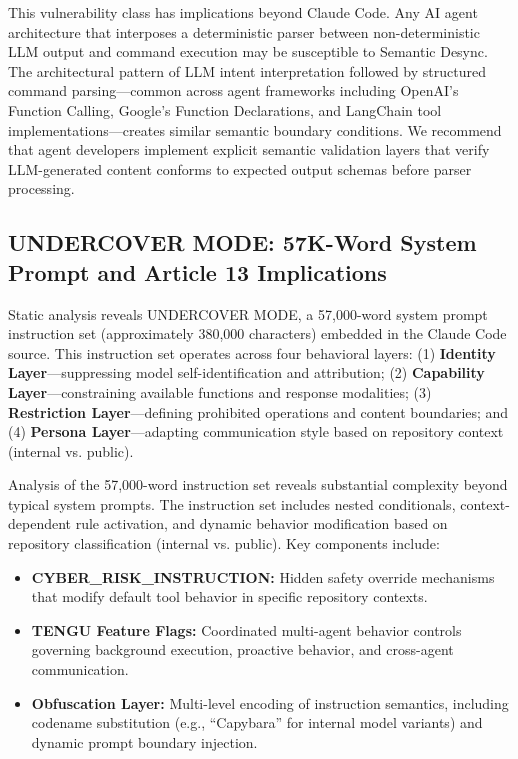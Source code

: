 \documentclass[10pt,conference]{IEEEtran}
\begin{document}
This vulnerability class has implications beyond Claude Code. Any AI agent architecture that interposes a deterministic parser between non-deterministic LLM output and command execution may be susceptible to Semantic Desync. The architectural pattern of LLM intent interpretation followed by structured command parsing---common across agent frameworks including OpenAI's Function Calling, Google's Function Declarations, and LangChain tool implementations---creates similar semantic boundary conditions. We recommend that agent developers implement explicit semantic validation layers that verify LLM-generated content conforms to expected output schemas before parser processing.

\subsection{UNDERCOVER MODE: 57K-Word System Prompt and Article 13 Implications}
\label{subsec:undercover}

Static analysis reveals UNDERCOVER MODE, a 57,000-word system prompt instruction set (approximately 380,000 characters) embedded in the Claude Code source. This instruction set operates across four behavioral layers: (1) \textbf{Identity Layer}---suppressing model self-identification and attribution; (2) \textbf{Capability Layer}---constraining available functions and response modalities; (3) \textbf{Restriction Layer}---defining prohibited operations and content boundaries; and (4) \textbf{Persona Layer}---adapting communication style based on repository context (internal vs. public).

Analysis of the 57,000-word instruction set reveals substantial complexity beyond typical system prompts. The instruction set includes nested conditionals, context-dependent rule activation, and dynamic behavior modification based on repository classification (internal vs. public). Key components include:

\begin{itemize}
    \item \textbf{CYBER\_RISK\_INSTRUCTION:} Hidden safety override mechanisms that modify default tool behavior in specific repository contexts.
    \item \textbf{TENGU Feature Flags:} Coordinated multi-agent behavior controls governing background execution, proactive behavior, and cross-agent communication.
    \item \textbf{Obfuscation Layer:} Multi-level encoding of instruction semantics, including codename substitution (e.g., ``Capybara'' for internal model variants) and dynamic prompt boundary injection.
\end{itemize}
\end{document}

